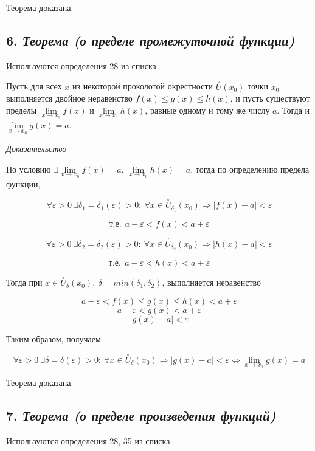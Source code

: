 Теорема доказана.
\newpage 
\subsection*{6. \textit{Теорема (о пределе промежуточной функции)}}
\begin{Quote2} 
\small\centering 

Используются определения 28 из списка \end{Quote2} 

Пусть для всех $x$ из некоторой проколотой окрестности $\overset{\circ}U(x_0)$ точки $x_0$ выполняется двойное неравенство $f(x) \leqslant g(x) \leqslant h(x)$, и пусть существуют пределы $\lim\limits_{x \to x_0}f(x)$ и $\lim\limits_{x \to x_0}h(x)$, равные одному и тому же числу $a$. Тогда и $\lim\limits_{x \to x_0}g(x) = a$.
\vspace*{20pt} 

\textit{Доказательство}

По условию $\exists \lim\limits_{x \to x_0}f(x) = a$, $\lim\limits_{x \to x_0}h(x) = a$, тогда по определению предела функции,

$$
\forall {\varepsilon}  > 0 \ \exists \delta_1= \delta_1 ({\varepsilon} ) > 0: \ \forall x \in \overset{\circ}U_{\delta_1}(x_0) \Rightarrow | f(x) - a|  < {\varepsilon}
$$

$$
\text{т.е.} \ \ a - {\varepsilon} < f(x) < a + {\varepsilon}
$$

$$
\forall {\varepsilon}  > 0 \ \exists \delta_2= \delta_2 ({\varepsilon} ) > 0: \ \forall x \in \overset{\circ}U_{\delta_2}(x_0) \Rightarrow | h(x) - a|  < {\varepsilon}
$$

$$
\text{т.е.} \ \ a - {\varepsilon} < h(x) < a + {\varepsilon}
$$

Тогда при $x \in \overset{\circ}U_{\delta}(x_0), \ \delta = min(\delta_1, \delta_2)$, выполняется неравенство

$$
a - {\varepsilon} < f(x) \leqslant g(x) \leqslant h(x) < a+ {\varepsilon}
$$ $$
a - {\varepsilon} <  g(x) < a+ {\varepsilon}
$$ $$
| g(x) - a|  < {\varepsilon}
$$

Таким образом, получаем

$$
\forall {\varepsilon} > 0 \ \exists \delta = \delta({\varepsilon}) > 0: \ \forall x \in \overset{\circ}U_{\delta}(x_0) \Rightarrow | g(x) - a|  < {\varepsilon} \iff \lim\limits_{x \to x_0} g(x) = a
$$

Теорема доказана.
\newpage 
\subsection*{7. \textit{Теорема (о пределе произведения функций)}}
\begin{Quote2} 
\small\centering 

Используются определения 28, 35 из списка \end{Quote2} 

